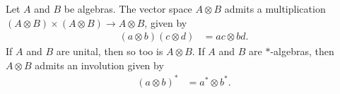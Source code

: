 \begin{proposition}\label{prop:tensor_product_algebras}
  Let $A$ and $B$ be algebras. The vector space $A\otimes B$ admits a multiplication $\left( A\otimes B \right)\times \left( A\otimes B \right)\rightarrow A\otimes B$, given by
  \begin{align*}
    \left( a\otimes b \right)\left( c\otimes d \right) &= ac\otimes bd.
  \end{align*}
  If $A$ and $B$ are unital, then so too is $A\otimes B$. If $A$ and $B$ are $\ast$-algebras, then $A\otimes B$ admits an involution given by
  \begin{align*}
    \left( a\otimes b \right)^{\ast} &= a^{\ast}\otimes b^{\ast}.
  \end{align*}
\end{proposition}
